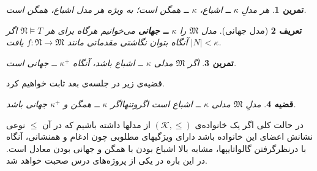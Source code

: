 \documentclass[12pt,a4paper]{article}
\theoremstyle{colorhead}
\newtheorem{thm}{قضیه}
\newtheorem{tam}[thm]{تمرین}
\newtheorem{defn}[thm]{تعریف}
\begin{document}
\begin{tam}
هر مدلِ
$\kappa$
ــ
اشباع،
$\kappa$
ــ
همگن است؛ به ویژه هر مدل اشباع، همگن است.
\end{tam}
\begin{defn}[مدل جهانی]
مدل
$\mathfrak{M}$
را
\textbf{$\kappa$
ــ
جهانی }
می‌خوانیم هرگاه برای هر
$\mathfrak{N}\models T$
اگر
$|N|<\kappa$
آنگاه بتوان نگاشتی مقدماتی مانند
$f:\mathfrak{N}\to \mathfrak{M}$
یافت.
\end{defn}
\begin{tam}
اگر
$\mathfrak{M}$
مدلی
$\kappa$ ــ
اشباع باشد، آنگاه 
$\kappa^+$
ــ 
جهانی است.
\end{tam}
قضیه‌ی زیر در جلسه‌ی بعد ثابت خواهیم کرد.
\begin{thm}
مدلِ
$\mathfrak{M}$
مدلی
$\kappa$ ــ
اشباع است اگروتنهااگر
$\kappa$
ــ
همگن و 
$\kappa^+$
جهانی باشد.
\end{thm}
در حالت کلی اگر یک
خانواده‌ی
$(\mathcal{K},\leq)$
از مدلها
داشته باشیم که در آن
$\leq$
نوعی نشانش اعضای این خانواده باشد دارای ویژگیهای مطلوبی چون ادغام و  همنشانی،
آنگاه با درنظرگرفتن
گالواتایپها،   مشابه بالا 
اشباع بودن با همگن و جهانی بودن معادل است. در این باره در یکی از پروژه‌های درس صحبت خواهد شد. 
\end{document}
